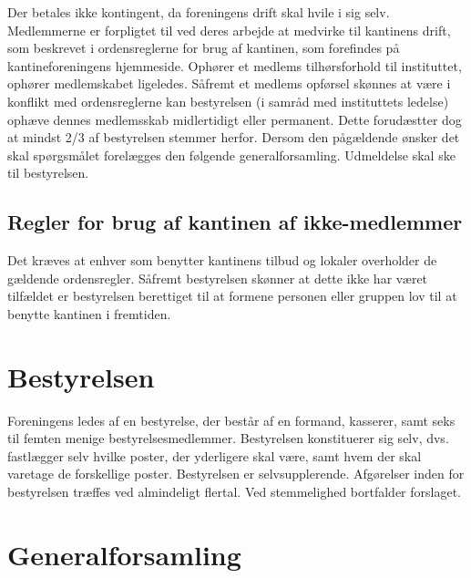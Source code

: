 \documentclass[a4paper, 10pt]{article}
\begin{document}
Der betales ikke kontingent, da foreningens drift skal hvile i sig
selv. Med\-lemmerne er forpligtet til ved deres arbejde at medvirke
til kantinens drift, som beskrevet i ordensreglerne for brug af
kantinen, som forefindes på kantineforeningens hjemmeside.  Ophører et
medlems tilhørsforhold til instituttet, ophører medlemskabet
ligeledes.  Såfremt et medlems opførsel skønnes at være i konflikt med
ordensreglerne kan bestyrelsen (i samråd med instituttets le\-delse)
ophæve dennes medlemsskab midlertidigt eller permanent. Dette
forudæstter dog at mindst 2/3 af bestyrelsen stemmer herfor. Dersom
den pågældende ønsker det skal spørgsmålet forelægges den følgende
generalforsamling. Udmeldelse skal ske til bestyrelsen.

\subsection{Regler for brug af kantinen af ikke-medlemmer}

Det kræves at enhver som benytter kantinens tilbud og lokaler
overholder de gældende ordensregler. Såfremt bestyrelsen skønner at
dette ikke har været tilfældet er bestyrelsen berettiget til at
formene personen eller gruppen lov til at benytte kantinen i
fremtiden.

\section{Bestyrelsen}

Foreningens ledes af en bestyrelse, der består af en formand,
kasserer, samt seks til femten menige bestyrelsesmedlemmer.
Bestyrelsen konstituerer sig selv, dvs. fastlægger selv hvilke poster,
der yderligere skal være, samt hvem der skal varetage de forskellige
poster. Bestyre\-lsen er selvsupplerende. Afgøre\-lser inden for
bestyrelsen træffes ved almindeligt flertal. Ved stemmelighed
bortfalder forslaget.

\section{Generalforsamling}
\end{document}
